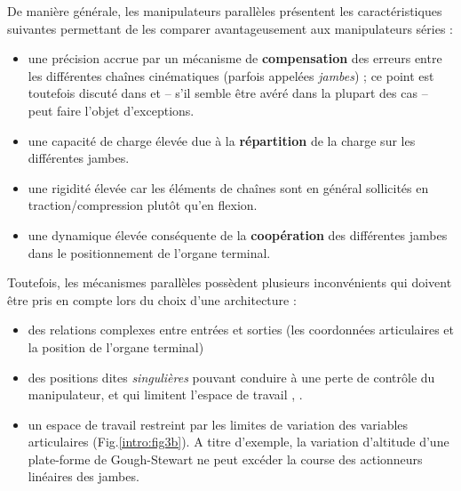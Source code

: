 De manière générale, les manipulateurs parallèles présentent les 
caractéristi\-ques sui\-vantes permettant de les comparer avantageusement aux 
manipulateurs séries :
\begin{itemize}
 \item une précision accrue par un mécanisme de {\bf compensation} des erreurs 
entre les différentes chaînes cinématiques (parfois appelées {\it jambes}) ; ce 
point est toutefois discut\'e dans \cite{briot2007}\cite{nzue2010} et -- s'il 
semble \^etre av\'er\'e dans la plupart des cas -- peut faire l'objet 
d'exceptions.
 \item une capacité de charge élevée due à la {\bf répartition} de la charge 
sur les différentes jambes.
 \item une rigidité élevée car les éléments de chaînes sont en g\'en\'eral 
sollicités en traction/compression plutôt qu'en flexion.
 \item une dynamique élevée conséquente de la {\bf coopération} des différentes 
jam\-bes dans le positionnement de l'organe terminal.
\end{itemize}

Toutefois, les mécanismes parallèles possèdent plusieurs inconvénients qui 
doivent être pris en compte lors du choix d'une architecture :
\begin{itemize}
 \item des relations complexes entre entrées et sorties (les coordonn\'ees 
articulaires et la position de l'organe terminal)
 \item des positions dites {\it singulières} pouvant conduire à une perte de 
contrôle du manipulateur, et qui limitent l'espace de travail 
\cite{merlet89singular}, \cite{park1998}.
 \item un espace de travail restreint par les limites de variation des 
variables articulaires (Fig.\ref{intro:fig3b}). A titre d'exemple, la variation 
d'altitude d'une plate-forme de Gough-Stewart ne peut excéder la course des 
actionneurs linéaires des jambes.
\end{itemize}

